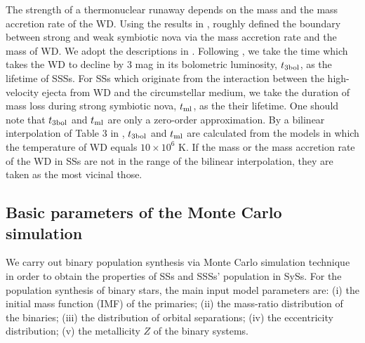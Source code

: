 \documentclass{elsart}
\begin{document}
The strength of a thermonuclear runaway depends on the mass and the
mass accretion rate of the WD. Using the results in \cite{yar05},
\cite{lu06} roughly defined the boundary between strong and weak
symbiotic nova via the mass accretion rate and the mass of WD. We
adopt the descriptions in \citet{lu06}. Following \citet{yun96}, we
take the time which takes the WD to decline by 3 mag in its
bolometric luminosity, $t_{\rm 3bol}$, as the lifetime of SSSs. For
SSs which originate from the interaction between the high-velocity
ejecta from WD and the circumstellar medium, we take the duration of
mass loss during strong symbiotic nova, $t_{\rm ml}$, as the their
lifetime. One should note that $t_{\rm 3bol}$ and $t_{\rm ml}$ are
only a zero-order approximation. By a bilinear interpolation
\citep{pre92} of Table 3 in \cite{yar05}, $t_{\rm 3bol}$ and $t_{\rm
ml}$ are calculated from the models in which the temperature of WD
equals $10\times 10^6$ K. If the mass or the mass accretion rate of
the WD in SSs are not in the range of the bilinear interpolation,
they are taken as the most vicinal those.


\subsection{Basic parameters of the Monte Carlo simulation}
We carry out binary population synthesis via Monte Carlo simulation
technique in order to obtain the properties of SSs and SSSs'
population in SySs. For the population synthesis of binary stars,
the main input model parameters are: (i) the initial mass function
(IMF) of the primaries; (ii) the mass-ratio distribution of the
binaries; (iii)
 the distribution of orbital separations; (iv) the eccentricity
distribution; (v) the metallicity $Z$ of the binary systems.
\end{document}
